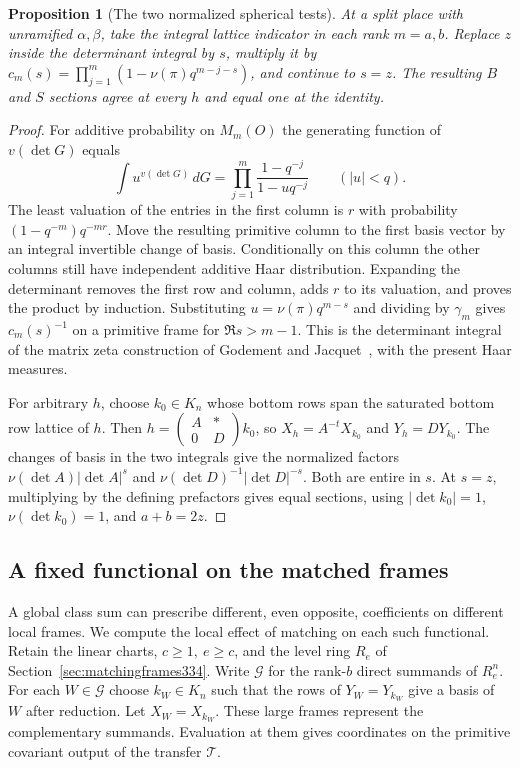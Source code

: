 \documentclass[a4paper,11pt]{article}
\newtheorem{proposition}{Proposition}[section]
\theoremstyle{definition}
\theoremstyle{remark}
\numberwithin{equation}{section}
\begin{document}
\begin{proposition}[The two normalized spherical tests]\label{prop:sphericalframe334}
At a split place with unramified \(\alpha,\beta\), take the integral
lattice indicator in each rank \(m=a,b\). Replace \(z\) inside the
determinant integral by \(s\), multiply it by
\(c_m(s)=\prod_{j=1}^m(1-\nu(\pi)q^{m-j-s})\), and continue to \(s=z\).
The resulting \(B\) and \(S\) sections agree at every \(h\) and equal
one at the identity.
\end{proposition}
\begin{proof}
For additive probability on \(M_m(O)\) the generating function of
\(v(\det G)\) equals
\[
       \int u^{v(\det G)}\,dG=\prod_{j=1}^m
                  \frac{1-q^{-j}}{1-uq^{-j}}\qquad (|u|<q).
\]
The least valuation of the entries in the first column is \(r\) with
probability \((1-q^{-m})q^{-mr}\). Move the resulting primitive column
to the first basis vector by an integral invertible change of basis.
Conditionally on this column the other columns still have independent
additive Haar distribution. Expanding the determinant removes the first
row and column, adds \(r\) to its valuation, and proves the product by
induction. Substituting \(u=\nu(\pi)q^{m-s}\) and dividing by
\(\gamma_m\) gives \(c_m(s)^{-1}\) on a primitive frame for
\(\Re s>m-1\). This is the determinant integral of the matrix zeta
construction of Godement and Jacquet~\cite{XVII-XII-gj334}, with the present
Haar measures.

For arbitrary \(h\), choose \(k_0\in K_n\) whose bottom rows span the
saturated bottom row lattice of \(h\). Then
\(h=\left(\begin{smallmatrix}A&*\\0&D\end{smallmatrix}\right)k_0\),
so \(X_h=A^{-t}X_{k_0}\) and \(Y_h=D Y_{k_0}\).
The changes of basis in the two integrals give the normalized factors
\(\nu(\det A)|\det A|^s\) and \(\nu(\det D)^{-1}|\det D|^{-s}\).
Both are entire in \(s\). At \(s=z\), multiplying by the defining
prefactors gives equal sections, using \(|\det k_0|=1\),
\(\nu(\det k_0)=1\), and \(a+b=2z\).
\end{proof}


\subsection{A fixed functional on the matched frames}\label{sec:signedrow335}

A global class sum can prescribe different, even opposite, coefficients
on different local frames. We compute the local effect of matching on
each such functional. Retain the linear charts, \(c\ge1,\ e\ge c\),
and the level ring \(R_e\) of Section~\ref{sec:matchingframes334}.
Write \(\mathcal G\) for the rank-\(b\) direct summands of \(R_e^n\).
For each \(W\in\mathcal G\) choose \(k_W\in K_n\) such that the rows
of \(Y_W=Y_{k_W}\) give a basis of \(W\) after reduction. Let
\(X_W=X_{k_W}\). These large frames represent the complementary
summands. Evaluation at them gives coordinates on the primitive
covariant output of the transfer \(\mathcal T\).
\end{document}

